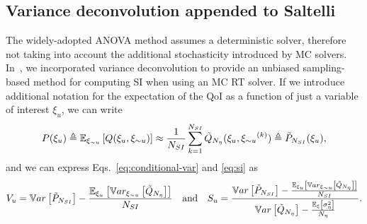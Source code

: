 \subsection{Variance deconvolution appended to Saltelli}
The widely-adopted ANOVA method %
assumes a deterministic solver, therefore not taking into account the additional stochasticity introduced by MC solvers. In~\cite{OlsonANSWinter}, we incorporated variance deconvolution to %
provide an unbiased sampling-based method for computing SI when using an MC RT solver. %
%
If we introduce additional notation for the expectation of the QoI as a function of just a variable of interest $\xi_u$, we can write
\begin{equation}
 P(\xi_u) \triangleq \mathbb{E}_{{\xi_{\sim u}}} \left[ Q({\xi_u},{\xi_{\sim u}}) \right] \approx \frac{1}{{N_{SI}}} \sum_{k=1}^{{N_{SI}}} \tilde{Q}_{N_\eta}( {\xi_u}, {\xi_{\sim u}}^{(k)} ) \triangleq \tilde{P}_{N_{SI}}({\xi_u}),
\end{equation}
and we can express Eqs.~\eqref{eq:conditional-var} and \eqref{eq:si} as 
\begin{equation}
 V_u %
     = \Var{\Ppoll} - \frac{\EEu{ \Vnu{\Qpoll} }}{\Nsi} \quad \mathrm{and} \quad 
% 
 S_u %
     = \frac{\Var{\Ppoll} - \frac{\EEu{ \Vnu{\Qpoll} }}{\Nsi}}{\Var{\Qpoll} - \frac{\EExi{ \SigSqeta }}{\Neta}} .
\end{equation}

